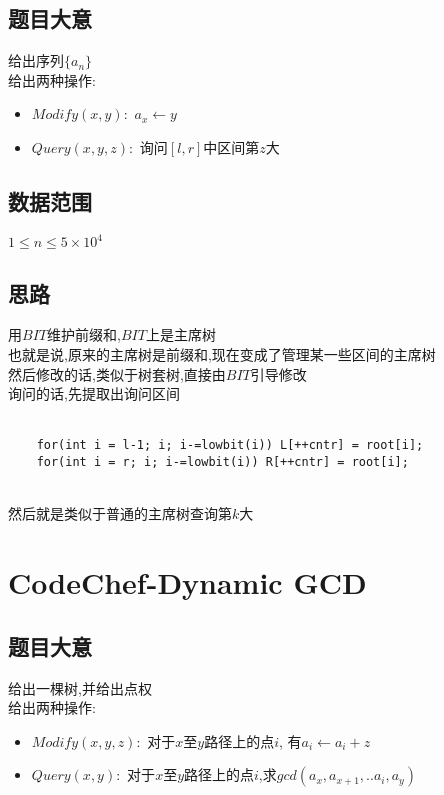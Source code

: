 \documentclass{ctexart}
\numberwithin{equation}{section}
\begin{document}
\begin{flushleft}
  \subsection{题目大意}
  给出序列$\{a_n\}$\\
  给出两种操作:\\
  \begin{itemize}
  \item $Modify(x,y):$ $a_x\leftarrow y$
  \item $Query(x,y,z):$ 询问$[l,r]$中区间第$z$大
  \end{itemize}
  \subsection{数据范围}
  $1\le n\le 5\times 10^4$\\
  \subsection{思路}
  用$BIT$维护前缀和,$BIT$上是主席树\\
  也就是说,原来的主席树是前缀和,现在变成了管理某一些区间的主席树\\
  然后修改的话,类似于树套树,直接由$BIT$引导修改\\
  询问的话,先提取出询问区间\\

  ~\\
  \lstset{language=C++}
  \begin{lstlisting}
    for(int i = l-1; i; i-=lowbit(i)) L[++cntr] = root[i];
    for(int i = r; i; i-=lowbit(i)) R[++cntr] = root[i];
  \end{lstlisting}
  ~\\

  然后就是类似于普通的主席树查询第$k$大\\
  \newpage

  \section{CodeChef-Dynamic GCD}
  \subsection{题目大意}
  给出一棵树,并给出点权\\
  给出两种操作:\\
  \begin{itemize}
  \item $Modify(x,y,z):$ 对于$x$至$y$路径上的点$i$, 有$a_i\leftarrow a_i+z$
  \item $Query(x,y):$ 对于$x$至$y$路径上的点$i$,求$gcd(a_x,a_{x+1},..a_{i},a_{y})$
  \end{itemize}

\end{flushleft}
\end{document}
